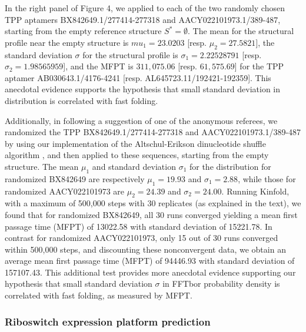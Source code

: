 In the right panel of Figure 4, we
applied \fftbor to each of the two randomly chosen TPP \rb
aptamers BX842649.1/277414-277318 and AACY022101973.1/389-487, starting
from the empty reference structure $S^*=\emptyset$.
The mean for the \fftbor structural profile near the empty
structure is $mu_1=23.0203$  [resp. $\mu_2=27.5821$], the
standard deviation $\sigma$ for the \fftbor structural profile
is $\sigma_1=2.22528791$  [resp. $\sigma_2=1.98565959$], and the \kinfold MFPT is
$311,075.06$ [resp. $61,575.69$] for the TPP \rb aptamer
AB030643.1/4176-4241 [resp.  AL645723.11/192421-192359]. This anecdotal evidence supports the hypothesis that small standard deviation in \fftbor distribution is correlated with fast folding.

Additionally, in following a suggestion of one of the anonymous referees, we randomized the TPP \rbs BX842649.1/277414-277318 and AACY022101973.1/389-487 by using our implementation of the Altschul-Erikson dinucleotide shuffle algorithm
\citep{altschulErikson:dinucleotideShuffle}, and then applied \fftbor to these sequences, starting from the empty structure.  The mean $\mu_1$ and standard deviation $\sigma_1$ for the \fftbor distribution for randomized BX842649 are respectively $\mu_1=19.93$ and $\sigma_1=2.88$, while those for randomized AACY022101973 are $\mu_2= 24.39$ and $\sigma_2=24.00$. Running Kinfold, with a maximum of 500,000 steps with 30 replicates (as explained in the text), we found that for randomized BX842649, all 30 runs converged yielding a mean first passage time (MFPT) of 13022.58  with standard deviation of 15221.78. In contrast for randomized AACY022101973, only 15 out of 30 runs converged within 500,000 steps, and discounting these nonconvergent data, we obtain an average mean first passage time (MFPT) of 94446.93  with standard deviation of 157107.43. This additional test provides more anecdotal evidence supporting our hypothesis that small standard deviation $\sigma$ in FFTbor probability density is correlated with fast folding, as measured by MFPT.
%
%

\subsubsection*{Riboswitch expression platform prediction}

